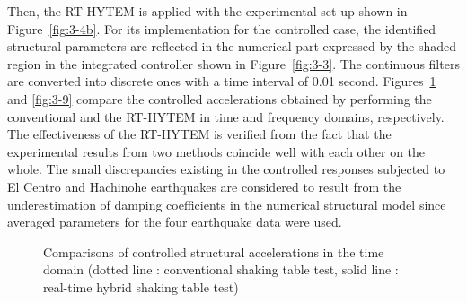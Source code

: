 Then, the RT-HYTEM is applied with the experimental set-up shown in Figure~\ref{fig:3-4b}. For its implementation for the controlled case, the identified structural parameters are reflected in the numerical part expressed by the shaded region in the integrated controller shown in Figure~\ref{fig:3-3}. The continuous filters are converted into discrete ones with a time interval of 0.01 second. Figures~\ref{fig:3-8} and \ref{fig:3-9} compare the controlled accelerations obtained by performing the conventional and the RT-HYTEM in time and frequency domains, respectively. The effectiveness of the RT-HYTEM is verified from the fact that the experimental results from two methods coincide well with each other on the whole. The small discrepancies existing in the controlled responses subjected to El Centro and Hachinohe earthquakes are considered to result from the underestimation of damping coefficients in the numerical structural model since averaged parameters for the four earthquake data were used.

\begin{figure}[!ht]
\centering
\caption{Comparisons of controlled structural accelerations in the time domain
(dotted line : conventional shaking table test, solid line : real-time hybrid shaking table test)
}
\label{fig:3-8}
\end{figure}

